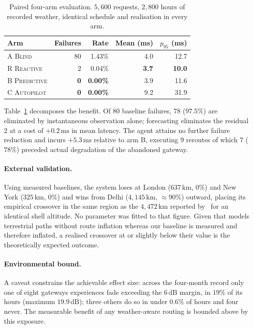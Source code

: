 \documentclass[10pt,twocolumn]{article}
\newcommand{\ms}{\,\mathrm{ms}}
\newcommand{\km}{\,\mathrm{km}}
\newcommand{\dB}{\,\mathrm{dB}}
\begin{document}
\begin{table}[t]
\centering
\caption{Paired four-arm evaluation. $5{,}600$ requests, $2{,}800$ hours of
recorded weather, identical schedule and realisation in every arm.}
\label{tab:arms}
\small
\setlength{\tabcolsep}{4pt}
\begin{tabular}{@{}lrrrr@{}}
\toprule
Arm & Failures & Rate & Mean (ms) & $p_{95}$ (ms) \\
\midrule
A \textsc{Blind}      & 80 & 1.43\% & 4.0 & 12.7 \\
R \textsc{Reactive}   &  2 & 0.04\% & \textbf{3.7} & \textbf{10.0} \\
B \textsc{Predictive} & \textbf{0} & \textbf{0.00\%} & 3.9 & 11.6 \\
C \textsc{Autopilot}  & \textbf{0} & \textbf{0.00\%} & 9.2 & 31.9 \\
\bottomrule
\end{tabular}
\end{table}

Table~\ref{tab:arms} decomposes the benefit. Of $80$ baseline failures,
$78$ ($97.5\%$) are eliminated by instantaneous observation alone; forecasting
eliminates the residual $2$ at a cost of $+0.2\ms$ in mean latency. The agent
attains no further failure reduction and incurs $+5.3\ms$ relative to arm B,
executing $9$ reroutes of which $7$ ($78\%$) preceded actual degradation of the
abandoned gateway.

\paragraph{External validation.} Using measured baselines, the system loses at
London ($637\km$, $0\%$) and New York ($325\km$, $0\%$) and wins from Delhi
($4{,}145\km$, $\approx90\%$) outward, placing its empirical crossover in the
same region as the $4{,}472\km$ reported by~\cite{chaudhry2022} for an identical
shell altitude. No parameter was fitted to that figure. Given that
\cite{chaudhry2022} models terrestrial paths without route inflation whereas our
baseline is measured and therefore inflated, a realised crossover at or slightly
below their value is the theoretically expected outcome.

\paragraph{Environmental bound.} A caveat constrains the achievable effect size:
across the four-month record only one of eight gateways experiences fade
exceeding the $6\dB$ margin, in $19\%$ of its hours (maximum $19.9\dB$); three
others do so in under $0.6\%$ of hours and four never. The measurable benefit of
any weather-aware routing is bounded above by this exposure.
\end{document}
